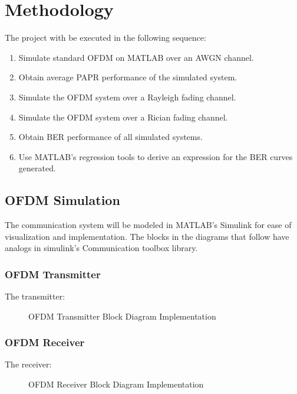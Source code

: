 
\chapter{Methodology}
The project with be executed in the following sequence:
\begin{enumerate}[label=\roman*.]
	\item Simulate standard \gls{OFDM} on MATLAB over an \gls{AWGN} channel.
	\item Obtain average \gls{PAPR} performance of the simulated system.
	\item Simulate the \gls{OFDM} system over a Rayleigh fading channel.
	\item Simulate the \gls{OFDM} system over a Rician fading channel.
	\item Obtain \gls{BER} performance of all simulated systems.
	\item Use MATLAB's regression tools to derive an expression for the \gls{BER} curves generated.
\end{enumerate}

\section{\gls{OFDM} Simulation}
The communication system will be modeled in MATLAB's Simulink for ease of visualization and implementation. The blocks in the diagrams that follow have analogs in \gls{simulink}'s Communication toolbox library.
\subsection{\gls{OFDM} Transmitter}
The transmitter:
\begin{figure}[htpb!]
	\centerline{\resizebox{15cm}{!}{}}
	\caption{\gls{OFDM} Transmitter Block Diagram Implementation}
	\label{fig:ofdm_t_meth}
\end{figure}
\pagebreak
\subsection{\gls{OFDM} Receiver}
The receiver:
\begin{figure}[htpb!]
	\centerline{\resizebox{15cm}{!}{}}
	\caption{\gls{OFDM} Receiver Block Diagram Implementation}
	\label{fig:ofdm_r_meth}
\end{figure}
\pagebreak
